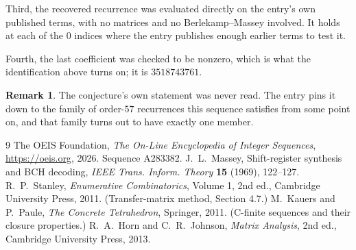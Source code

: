 \documentclass[11pt,a4paper]{article}
\theoremstyle{plain}
\theoremstyle{definition}
\newtheorem{remark}[theorem]{Remark}
\begin{document}
Third, the recovered recurrence was evaluated directly on the entry's own published terms, with
no matrices and no Berlekamp--Massey involved. It holds at each of the $0$ indices where
the entry publishes enough earlier terms to test it.

Fourth, the last coefficient was checked to be nonzero, which is what the identification above
turns on; it is $3518743761$.

\begin{remark}
The conjecture's own statement was never read. The entry pins it down to the family of
order-$57$ recurrences this sequence satisfies from some point on, and that family turns
out to have exactly one member.
\end{remark}

\begin{thebibliography}{9}
 The OEIS Foundation, \emph{The On-Line Encyclopedia of Integer
Sequences}, \url{https://oeis.org}, 2026. Sequence A283382.
 J.~L.~Massey, Shift-register synthesis and BCH decoding, \emph{IEEE
Trans. Inform. Theory} \textbf{15} (1969), 122--127.
 R.~P.~Stanley, \emph{Enumerative Combinatorics}, Volume 1, 2nd ed.,
Cambridge University Press, 2011. (Transfer-matrix method, Section 4.7.)
 M.~Kauers and P.~Paule, \emph{The Concrete Tetrahedron}, Springer, 2011.
(C-finite sequences and their closure properties.)
 R.~A.~Horn and C.~R.~Johnson, \emph{Matrix Analysis}, 2nd ed., Cambridge
University Press, 2013.
\end{thebibliography}
\end{document}

